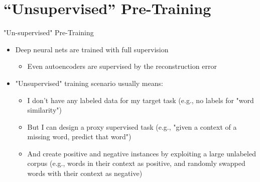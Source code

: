 \documentclass[12pt]{beamer}
\begin{document}
\section{``Unsupervised'' Pre-Training}

\begin{frame}{"Un-supervised" Pre-Training}

\begin{itemize}
	\item Deep neural nets are trained with full supervision
	\begin{itemize}
		\item Even autoencoders are supervised by the reconstruction error
	\end{itemize}
	\item "Unsupervised" training scenario usually means:
	\begin{itemize}
		\item 	I don't have any labeled data for my target task (e.g., no labels for "word similarity")
		\item 	But I can design a proxy supervised task (e.g., "given a context of a missing word, predict that word")
		\item	And create positive and negative instances by exploiting a large unlabeled corpus (e.g., words in their context as positive, and randomly swapped words with their context as negative)
	\end{itemize}
\end{itemize}


\end{frame}
\end{document}
